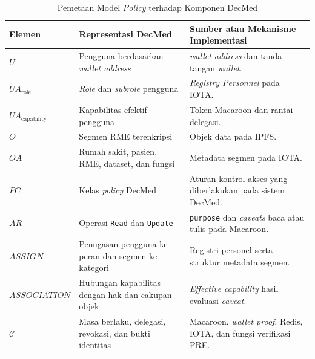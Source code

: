 \documentclass[bahasa, 12pt, a4paper, onecolumn, oneside, final]{report}
\begin{document}
\begin{table}[!ht]
	\centering
	\caption{Pemetaan Model \textit{Policy} terhadap Komponen DecMed}
	\label{tab:pemetaan-policy-machine-decmed}
	\small
	\begin{tabular}{|p{}|p{}|p{}|}
		\hline
		\textbf{Elemen}
		 & \textbf{Representasi DecMed}
		 & \textbf{Sumber atau Mekanisme Implementasi}                              \\ \hline

		$U$
		 & Pengguna berdasarkan \textit{wallet address}
		 & \textit{wallet address} dan tanda tangan \textit{wallet}.                \\ \hline

		$UA_{\text{role}}$
		 & \textit{Role} dan \textit{subrole} pengguna
		 & \textit{Registry Personnel} pada IOTA.                                   \\ \hline

		$UA_{\text{capability}}$
		 & Kapabilitas efektif pengguna
		 & Token Macaroon dan rantai delegasi.                                      \\ \hline

		$O$
		 & Segmen RME terenkripsi
		 & Objek data pada IPFS.                                                    \\ \hline

		$OA$
		 & Rumah sakit, pasien, RME, dataset, dan fungsi
		 & Metadata segmen pada IOTA.                                               \\ \hline

		$PC$
		 & Kelas \textit{policy} DecMed
		 & Aturan kontrol akses yang diberlakukan pada sistem DecMed.               \\ \hline

		$AR$
		 & Operasi \texttt{Read} dan \texttt{Update}
		 & \texttt{purpose} dan \textit{caveats} baca atau tulis pada Macaroon.     \\ \hline

		$ASSIGN$
		 & Penugasan pengguna ke peran dan segmen ke kategori
		 & Registri personel serta struktur metadata segmen.                        \\ \hline

		$ASSOCIATION$
		 & Hubungan kapabilitas dengan hak dan cakupan objek
		 & \textit{Effective capability} hasil evaluasi \textit{caveat}.            \\ \hline

		$\mathcal{C}$
		 & Masa berlaku, delegasi, revokasi, dan bukti identitas
		 & Macaroon, \textit{wallet proof}, Redis, IOTA, dan fungsi verifikasi PRE. \\ \hline
	\end{tabular}

\end{table}
\end{document}
